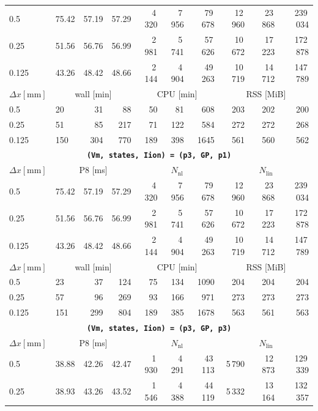 \documentclass[11pt,a4paper]{article}
\newcommand{\code}[1]{\texttt{\small #1}}
\begin{document}
\begin{center}
\begin{longtable}{l|lrr|rrr|rrr}
0.5 & 75.42 & 57.19 & 57.29 & 4\,320 & 7\,956 & 79\,678 & 12\,960 & 23\,868 & 239\,034\\
0.25 & 51.56 & 56.76 & 56.99 & 2\,981 & 5\,741 & 57\,626 & 10\,672 & 17\,223 & 172\,878\\
0.125 & 43.26 & 48.42 & 48.66 & 2\,144 & 4\,904 & 49\,263 & 10\,719 & 14\,712 & 147\,789\\
\hline
$ \Delta x [\text{mm}] $ & \multicolumn{3}{c|}{wall [min]} & \multicolumn{3}{c|}{CPU [min]} & \multicolumn{3}{c|}{RSS [MiB]}\\
0.5 & 20 & 31 & 88 & 50 & 81 & 608 & 203 & 202 & 200\\
0.25 & 51 & 85 & 217 & 71 & 122 & 584 & 272 & 272 & 268\\
0.125 & 150 & 304 & 770 & 189 & 398 & 1645 & 561 & 560 & 562\\
\hline
\hline
\multicolumn{10}{c}{\textbf{\code{(Vm, states, Iion) = (p3, GP, p1)}}}\\\hline
$ \Delta x [\text{mm}] $ & \multicolumn{3}{c|}{P8 [ms]} & \multicolumn{3}{c|}{$N_{\mathrm{nl}}$} & \multicolumn{3}{c|}{$N_{\mathrm{lin}}$}\\
0.5 & 75.42 & 57.19 & 57.29 & 4\,320 & 7\,956 & 79\,678 & 12\,960 & 23\,868 & 239\,034\\
0.25 & 51.56 & 56.76 & 56.99 & 2\,981 & 5\,741 & 57\,626 & 10\,672 & 17\,223 & 172\,878\\
0.125 & 43.26 & 48.42 & 48.66 & 2\,144 & 4\,904 & 49\,263 & 10\,719 & 14\,712 & 147\,789\\
\hline
$ \Delta x [\text{mm}] $ & \multicolumn{3}{c|}{wall [min]} & \multicolumn{3}{c|}{CPU [min]} & \multicolumn{3}{c|}{RSS [MiB]}\\
0.5 & 23 & 37 & 124 & 75 & 134 & 1090 & 204 & 204 & 204\\
0.25 & 57 & 96 & 269 & 93 & 166 & 971 & 273 & 273 & 273\\
0.125 & 151 & 299 & 804 & 189 & 385 & 1678 & 563 & 561 & 563\\
\hline
\hline
\multicolumn{10}{c}{\textbf{\code{(Vm, states, Iion) = (p3, GP, p3)}}}\\\hline
$ \Delta x [\text{mm}] $ & \multicolumn{3}{c|}{P8 [ms]} & \multicolumn{3}{c|}{$N_{\mathrm{nl}}$} & \multicolumn{3}{c|}{$N_{\mathrm{lin}}$}\\
0.5 & 38.88 & 42.26 & 42.47 & 1\,930 & 4\,291 & 43\,113 & 5\,790 & 12\,873 & 129\,339\\
0.25 & 38.93 & 43.26 & 43.52 & 1\,546 & 4\,388 & 44\,119 & 5\,332 & 13\,164 & 132\,357\\

\end{longtable}
\end{center}
\end{document}
